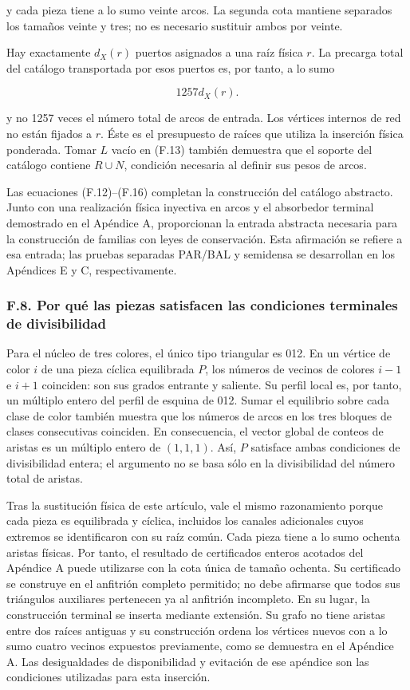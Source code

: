 \documentclass[spanish,11pt,a4paper]{article}
\begin{document}
y cada pieza tiene a lo sumo veinte arcos. La segunda cota mantiene separados los tamaños veinte y tres; no es necesario sustituir ambos por veinte.

Hay exactamente \(d_{X}(r)\) puertos asignados a una raíz física \(r\). La precarga total del catálogo transportada por esos puertos es, por tanto, a lo sumo

\[1257d_X(r).\tag{F.16}\]

y no 1257 veces el número total de arcos de entrada. Los vértices internos de red no están fijados a \(r\). Éste es el presupuesto de raíces que utiliza la inserción física ponderada. Tomar \(L\) vacío en (F.13) también demuestra que el soporte del catálogo contiene \(R\cup N\), condición necesaria al definir sus pesos de arcos.

Las ecuaciones (F.12)--(F.16) completan la construcción del catálogo abstracto. Junto con una realización física inyectiva en arcos y el absorbedor terminal demostrado en el Apéndice A, proporcionan la entrada abstracta necesaria para la construcción de familias con leyes de conservación. Esta afirmación se refiere a esa entrada; las pruebas separadas PAR/BAL y semidensa se desarrollan en los Apéndices E y C, respectivamente.

\subsubsection{F.8. Por qué las piezas satisfacen las condiciones terminales de divisibilidad}\label{f.8.-por-quuxe9-las-piezas-satisfacen-las-condiciones-terminales-de-divisibilidad}

Para el núcleo de tres colores, el único tipo triangular es 012. En un vértice de color \(i\) de una pieza cíclica equilibrada \(P\), los números de vecinos de colores \(i-1\) e \(i+1\) coinciden: son sus grados entrante y saliente. Su perfil local es, por tanto, un múltiplo entero del perfil de esquina de 012. Sumar el equilibrio sobre cada clase de color también muestra que los números de arcos en los tres bloques de clases consecutivas coinciden. En consecuencia, el vector global de conteos de aristas es un múltiplo entero de \((1,1,1)\). Así, \(P\) satisface ambas condiciones de divisibilidad entera; el argumento no se basa sólo en la divisibilidad del número total de aristas.

Tras la sustitución física de este artículo, vale el mismo razonamiento porque cada pieza es equilibrada y cíclica, incluidos los canales adicionales cuyos extremos se identificaron con su raíz común. Cada pieza tiene a lo sumo ochenta aristas físicas. Por tanto, el resultado de certificados enteros acotados del Apéndice A puede utilizarse con la cota única de tamaño ochenta. Su certificado se construye en el anfitrión completo permitido; no debe afirmarse que todos sus triángulos auxiliares pertenecen ya al anfitrión incompleto. En su lugar, la construcción terminal se inserta mediante extensión. Su grafo no tiene aristas entre dos raíces antiguas y su construcción ordena los vértices nuevos con a lo sumo cuatro vecinos expuestos previamente, como se demuestra en el Apéndice A. Las desigualdades de disponibilidad y evitación de ese apéndice son las condiciones utilizadas para esta inserción.
\end{document}

